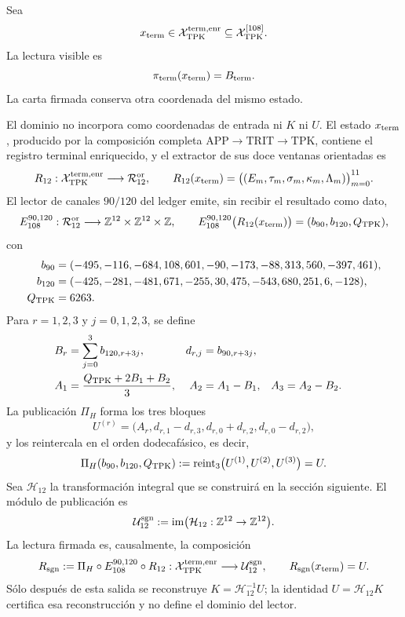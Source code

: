 Sea
\[
 x_{\rm term}\in
 \mathcal X_{\rm TPK}^{\rm term,enr}
 \subseteq\mathcal X_{\rm TPK}^{[108]}.
\]
La lectura visible es
\[
 \pi_{\rm term}(x_{\rm term})=B_{\rm term}.
\]
La carta firmada conserva otra coordenada del mismo estado.

\begin{definition}
\label{p3-83-c25-s4:def:subespacio-firmado-terminal}
El dominio no incorpora como coordenadas de entrada ni \(K\) ni \(U\). El
estado \(x_{\rm term}\), producido por la composición completa
\(\mathrm{APP}\to\mathrm{TRIT}\to\mathrm{TPK}\), contiene el registro
terminal enriquecido, y el extractor de sus doce ventanas orientadas es
\begin{equation}
 R_{12}:\mathcal X_{\rm TPK}^{\rm term,enr}
 \longrightarrow\mathcal R_{12}^{\rm or},
 \qquad
 R_{12}(x_{\rm term})
 =\bigl((E_m,\tau_m,\sigma_m,\kappa_m,\Lambda_m)\bigr)_{m=0}^{11}.
 \label{p3-83-c25-s4:eq:subespacio-firmado-terminal}
\end{equation}
El lector de canales \(90/120\) del ledger emite, sin recibir el resultado
como dato,
\[
 E_{108}^{90,120}:\mathcal R_{12}^{\rm or}
 \longrightarrow\mathbb Z^{12}\times\mathbb Z^{12}\times\mathbb Z,
 \qquad
 E_{108}^{90,120}\bigl(R_{12}(x_{\rm term})\bigr)
 =(b_{90},b_{120},Q_{\rm TPK}),
\]
con
\begin{align*}
 b_{90}={}&(-495,-116,-684,108,601,-90,
             -173,-88,313,560,-397,461),\\
 b_{120}={}&(-425,-281,-481,671,-255,30,
              475,-543,680,251,6,-128),\\
 Q_{\rm TPK}={}&6263.
\end{align*}
Para \(r=1,2,3\) y \(j=0,1,2,3\), se define
\[
\begin{aligned}
 B_r&=\sum_{j=0}^{3}b_{120,r+3j},
 &d_{r,j}&=b_{90,r+3j},\\
 A_1&=\frac{Q_{\rm TPK}+2B_1+B_2}{3},
 &A_2&=A_1-B_1,
 &A_3&=A_2-B_2.
\end{aligned}
\]
La publicación \(\Pi_H\) forma los tres bloques
\[
 U^{(r)}=
 \bigl(A_r,d_{r,1}-d_{r,3},d_{r,0}+d_{r,2},
 d_{r,0}-d_{r,2}\bigr),
\]
y los reintercala en el orden dodecafásico, es decir,
\[
 \Pi_H(b_{90},b_{120},Q_{\rm TPK})
 :=\operatorname{reint}_3\bigl(U^{(1)},U^{(2)},U^{(3)}\bigr)=U.
\]
Sea \(\mathcal H_{12}\) la
transformación integral que se construirá en la sección siguiente. El módulo
de publicación es
\begin{equation}
 \mathcal U_{12}^{\rm sgn}
 :=\operatorname{im}
 \bigl(\mathcal H_{12}:\mathbb Z^{12}\to\mathbb Z^{12}\bigr).
 \label{p3-83-c25-s4:eq:modulo-publicacion-firmada}
\end{equation}
La lectura firmada es, causalmente, la composición
\begin{equation}
 R_{\rm sgn}:=
 \Pi_H\circ E_{108}^{90,120}\circ R_{12}:
 \mathcal X_{\rm TPK}^{\rm term,enr}
 \longrightarrow\mathcal U_{12}^{\rm sgn},
 \qquad
 R_{\rm sgn}(x_{\rm term})=U.
 \label{p3-83-c25-s4:eq:lector-firmado-terminal}
\end{equation}
Sólo después de esta salida se reconstruye
\(K=\mathcal H_{12}^{-1}U\); la identidad
\(U=\mathcal H_{12}K\) certifica esa reconstrucción y no define el dominio
del lector.
\end{definition}


